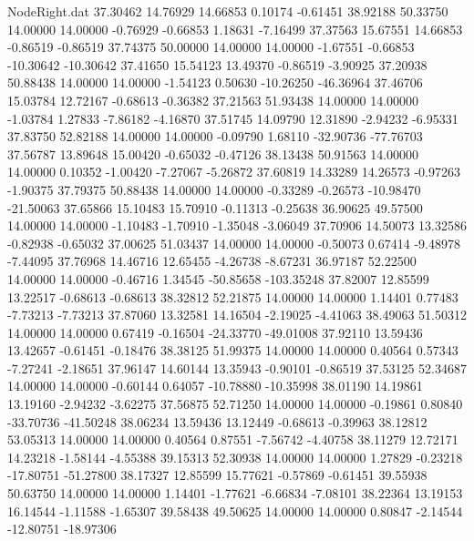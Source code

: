 \begin{filecontents}{NodeRight.dat}
  37.30462   14.76929   14.66853     0.10174   -0.61451   38.92188   50.33750   14.00000   14.00000   -0.76929   -0.66853    1.18631   -7.16499
  37.37563   15.67551   14.66853    -0.86519   -0.86519   37.74375   50.00000   14.00000   14.00000   -1.67551   -0.66853  -10.30642  -10.30642
  37.41650   15.54123   13.49370    -0.86519   -3.90925   37.20938   50.88438   14.00000   14.00000   -1.54123    0.50630  -10.26250  -46.36964
  37.46706   15.03784   12.72167    -0.68613   -0.36382   37.21563   51.93438   14.00000   14.00000   -1.03784    1.27833   -7.86182   -4.16870
  37.51745   14.09790   12.31890    -2.94232   -6.95331   37.83750   52.82188   14.00000   14.00000   -0.09790    1.68110  -32.90736  -77.76703
  37.56787   13.89648   15.00420    -0.65032   -0.47126   38.13438   50.91563   14.00000   14.00000    0.10352   -1.00420   -7.27067   -5.26872
  37.60819   14.33289   14.26573    -0.97263   -1.90375   37.79375   50.88438   14.00000   14.00000   -0.33289   -0.26573  -10.98470  -21.50063
  37.65866   15.10483   15.70910    -0.11313   -0.25638   36.90625   49.57500   14.00000   14.00000   -1.10483   -1.70910   -1.35048   -3.06049
  37.70906   14.50073   13.32586    -0.82938   -0.65032   37.00625   51.03437   14.00000   14.00000   -0.50073    0.67414   -9.48978   -7.44095
  37.76968   14.46716   12.65455    -4.26738   -8.67231   36.97187   52.22500   14.00000   14.00000   -0.46716    1.34545  -50.85658 -103.35248
  37.82007   12.85599   13.22517    -0.68613   -0.68613   38.32812   52.21875   14.00000   14.00000    1.14401    0.77483   -7.73213   -7.73213
  37.87060   13.32581   14.16504    -2.19025   -4.41063   38.49063   51.50312   14.00000   14.00000    0.67419   -0.16504  -24.33770  -49.01008
  37.92110   13.59436   13.42657    -0.61451   -0.18476   38.38125   51.99375   14.00000   14.00000    0.40564    0.57343   -7.27241   -2.18651
  37.96147   14.60144   13.35943    -0.90101   -0.86519   37.53125   52.34687   14.00000   14.00000   -0.60144    0.64057  -10.78880  -10.35998
  38.01190   14.19861   13.19160    -2.94232   -3.62275   37.56875   52.71250   14.00000   14.00000   -0.19861    0.80840  -33.70736  -41.50248
  38.06234   13.59436   13.12449    -0.68613   -0.39963   38.12812   53.05313   14.00000   14.00000    0.40564    0.87551   -7.56742   -4.40758
  38.11279   12.72171   14.23218    -1.58144   -4.55388   39.15313   52.30938   14.00000   14.00000    1.27829   -0.23218  -17.80751  -51.27800
  38.17327   12.85599   15.77621    -0.57869   -0.61451   39.55938   50.63750   14.00000   14.00000    1.14401   -1.77621   -6.66834   -7.08101
  38.22364   13.19153   16.14544    -1.11588   -1.65307   39.58438   49.50625   14.00000   14.00000    0.80847   -2.14544  -12.80751  -18.97306

\end{filecontents}
